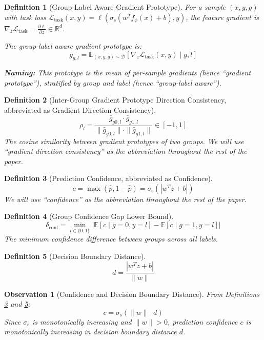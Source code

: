 \documentclass[11pt]{article}
\newtheorem{definition}{Definition}
\newtheorem{observation}{Observation}
\begin{document}
\begin{definition}[Group-Label Aware Gradient Prototype]
\label{def:grad_proto}
For a sample $(x, y, g)$ with task loss $\mathcal{L}_{\mathrm{task}}(x, y) = \ell(\sigma_{\text{s}}(w^T f_\phi(x) + b), y)$, the feature gradient is $\nabla_z \mathcal{L}_{\mathrm{task}} = \frac{\partial \ell}{\partial z} \in \mathbb{R}^d$.

The group-label aware gradient prototype is:
$$\bar{g}_{g,l} = \mathbb{E}_{(x,y,g) \sim \mathcal{D}} \left[ \nabla_z \mathcal{L}_{\mathrm{task}}(x, y) \mid g, l \right]$$

\textbf{Naming:} This prototype is the mean of per-sample gradients (hence ``gradient prototype''), stratified by group and label (hence ``group-label aware'').
\end{definition}

\begin{definition}[Inter-Group Gradient Prototype Direction Consistency, abbreviated as Gradient Direction Consistency]
\label{def:grad_consistency}
$$\rho_l = \frac{\bar{g}_{g0,l} \cdot \bar{g}_{g1,l}}{\|\bar{g}_{g0,l}\| \cdot \|\bar{g}_{g1,l}\|} \in [-1, 1]$$
The cosine similarity between gradient prototypes of two groups. We will use ``gradient direction consistency'' as the abbreviation throughout the rest of the paper.
\end{definition}

\begin{definition}[Prediction Confidence, abbreviated as Confidence]
\label{def:confidence}
$$c = \max(\hat{p}, 1 - \hat{p}) = \sigma_{\text{s}}(|w^T z + b|)$$
We will use ``confidence'' as the abbreviation throughout the rest of the paper.
\end{definition}

\begin{definition}[Group Confidence Gap Lower Bound]
\label{def:delta_conf}
$$\delta_{\mathrm{conf}} = \min_{l \in \{0,1\}} \left| \mathbb{E}[c \mid g=0, y=l] - \mathbb{E}[c \mid g=1, y=l] \right|$$
The minimum confidence difference between groups across all labels.
\end{definition}

\begin{definition}[Decision Boundary Distance]
\label{def:dbd}
$$d = \frac{|w^T z + b|}{\|w\|}$$
\end{definition}

\begin{observation}[Confidence and Decision Boundary Distance]
\label{obs:conf_dbd}
From Definitions \ref{def:confidence} and \ref{def:dbd}:
$$c = \sigma_{\text{s}}(\|w\| \cdot d)$$
Since $\sigma_{\text{s}}$ is monotonically increasing and $\|w\| > 0$, prediction confidence $c$ is monotonically increasing in decision boundary distance $d$.
\end{observation}
\end{document}
